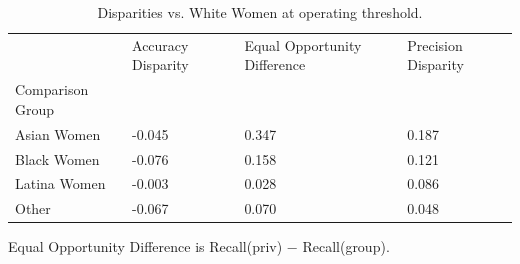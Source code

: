 \begin{table}[htbp]
\centering
\caption{Disparities vs. White Women at operating threshold.}
\label{tab:08-disparities-selfcheck}
\begin{tabular}{llll}
\toprule
 & Accuracy Disparity & Equal Opportunity Difference & Precision Disparity \\
Comparison Group &  &  &  \\
\midrule
Asian Women & -0.045 & 0.347 & 0.187 \\
Black Women & -0.076 & 0.158 & 0.121 \\
Latina Women & -0.003 & 0.028 & 0.086 \\
Other & -0.067 & 0.070 & 0.048 \\
\bottomrule
\end{tabular}

\begin{tablenotes}[flushleft]
\item \small{Equal Opportunity Difference is Recall(priv) − Recall(group).}
\end{tablenotes}
\end{table}